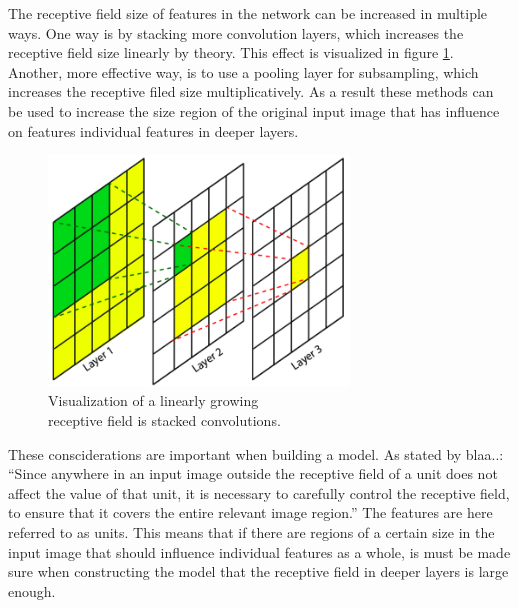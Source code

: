 \begin{minipage}{0.4\textwidth}
	The receptive field size of features in the network can be increased in multiple ways. One way is by stacking more convolution layers, which increases the receptive field size linearly by theory. This effect is visualized in figure \ref{fig:rec}. Another, more effective way, is to use a pooling layer for subsampling, which increases the receptive filed size multiplicatively. As a result these methods can be used to increase the size region of the original input image that has influence on features individual features in deeper layers. 
\end{minipage}
\begin{minipage}{0.6\textwidth}
	\begin{figure}[H]
		\centering
		\includegraphics[width=8cm]{images/nn/rec.png}
		\caption[Bild kurz]{Visualization of a linearly growing\\\hspace{0\textwidth} receptive field is stacked convolutions.}
		\label{fig:rec}
	\end{figure}
\end{minipage}


These consciderations are important when building a model. As stated by blaa..: \enquote{Since anywhere in an input image outside the receptive field of a unit does not affect the value of that unit, it is necessary to carefully control the receptive field, to ensure that it covers the entire relevant image region.} The features are here referred to as units. This means that if there are regions of a certain size in the input image that should influence individual features as a whole, is must be made sure when constructing the model that the receptive field in deeper layers is large enough.  

\newpage

